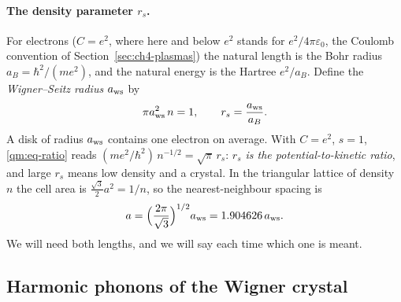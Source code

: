\paragraph{The density parameter $r_s$.} For electrons ($C=e^2$, where here and below $e^2$ stands for
$e^2/4\pi\varepsilon_0$, the Coulomb convention of Section~\ref{sec:ch4-plasmas}) the natural length is the Bohr
radius $a_B=\hbar^2/(me^2)$, and the natural energy is the Hartree $e^2/a_B$. Define the \emph{Wigner--Seitz radius}
$a_{\rm ws}$ by
\begin{equation}\label{qm:eq-rs}
\pi a_{\rm ws}^2\,n = 1,\qquad r_s=\frac{a_{\rm ws}}{a_B}.
\end{equation}
A disk of radius $a_{\rm ws}$ contains one electron on average. With $C=e^2$, $s=1$, \eqref{qm:eq-ratio} reads
$(me^2/\hbar^2)\,n^{-1/2}=\sqrt\pi\,r_s$: \emph{$r_s$ is the potential-to-kinetic ratio}, and large $r_s$ means low
density and a crystal. In the triangular lattice of density $n$ the cell area is $\frac{\sqrt3}{2}a^2=1/n$, so the
nearest-neighbour spacing is
\begin{equation}\label{qm:eq-a}
a=\Bigl(\frac{2\pi}{\sqrt3}\Bigr)^{1/2}a_{\rm ws}=1.904626\,a_{\rm ws}.
\end{equation}
We will need both lengths, and we will say each time which one is meant.

\subsection{Harmonic phonons of the Wigner crystal}\label{qm:sec-phonons}

